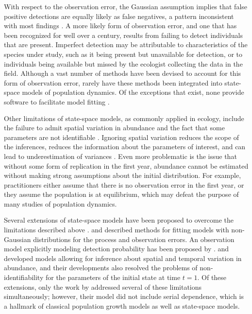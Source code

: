 \documentclass[12pt,english]{article}
\begin{document}
\begin{spacing}{1.9}
\begin{flushleft}
With respect to the observation error, the Gaussian assumption
implies that false positive detections are
equally likely as false negatives, a pattern inconsistent with most
findings \citep{miller_etal:2011}. 
A more likely form of observation error, and one that has been recognized for well
over a century, results from failing to detect individuals that are
present. Imperfect detection may be attributable to
characteristics of the species under study, such as it being present but unavailable for detection,
or to individuals being available but missed by the ecologist collecting the data in the field.
Although a vast number of methods have been devised to account for 
this form of observation error, rarely have these methods been
integrated into state-space models of population dynamics. 
Of the exceptions that exist, none provide software to facilitate model fitting 
\citep{buckland_etal:2004}.

Other limitations of state-space models, as commonly applied in ecology,
include the failure to admit spatial variation in abundance and
the fact that some parameters are not identifiable
\citep{polansky_etal:2009}. 
Ignoring spatial variation reduces the scope of the
inferences, reduces the information about the parameters of interest,
and can lead to underestimation of variances \citep{dennis_etal:2010}.
Even more problematic is the issue that without some form of replication in the first year, 
abundance cannot be estimated without making strong assumptions about 
the initial distribution. 
For example, practitioners either assume that there is no
observation error in the first year, or they assume the population is
at equilibrium, which may defeat the purpose of many studies of
population dynamics. 

Several extensions of state-space models have been proposed to
overcome the limitations described above \citep{newman_etal:2014}. \citet{devalpine_hastings:2002} and
\citet{brooks_etal:2004} described methods for fitting models with non-Gaussian
distributions for the process and observation errors. An observation model 
explicitly modeling
detection probability has been proposed by 
\citet{kery_etal:2009}. \citet{lele_etal:1998} and 
\citet{kery_etal:2009} developed models allowing for inference about
spatial and temporal variation in abundance, and their developments
also resolved the problems of non-identifiability for the parameters
of the initial state at time $t=1$. Of these extensions, only
the work by \citet{kery_etal:2009} addressed several of these limitations
simultaneously; however, their model did not include serial
dependence, which is a hallmark of classical population growth models as well as state-space models. 


\end{flushleft}
\end{spacing}
\end{document}
